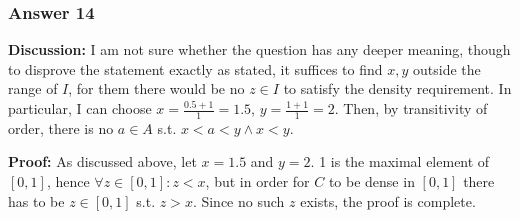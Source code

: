 \documentclass[11pt]{article}
\begin{document}
\subsubsection{Answer 14}
\label{sec-1-6-3}
\textbf{Discussion:} I am not sure whether the question has any deeper meaning,
though to disprove the statement exactly as stated, it suffices to find $x, y$
outside the range of $I$, for them there would be no $z \in I$ to satisfy
the density requirement.  In particular, I can choose $x=\frac{0.5+1}{1}=1.5$,
$y=\frac{1+1}{1}=2$.  Then, by transitivity of order, there is no $a \in A$
s.t. $x < a < y \land x < y$.

\textbf{Proof:} As discussed above, let $x=1.5$ and $y=2$. 1 is the maximal element
of $[0, 1]$, hence $\forall z \in [0, 1]: z < x$, but in order for $C$ to be
dense in $[0, 1]$ there has to be $z \in [0, 1]$ s.t. $z > x$.  Since no
such $z$ exists, the proof is complete.
\end{document}
